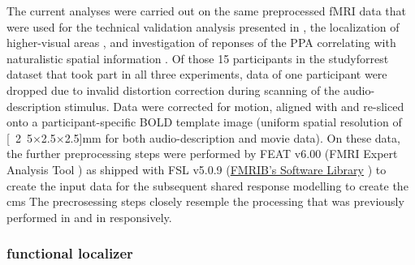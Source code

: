 
The current analyses were carried out on the same preprocessed fMRI data
\citep{hanke2016aligned} that were used for the technical validation analysis
presented in \citet{hanke2016simultaneous}, the localization of higher-visual
areas \citep{sengupta2016extension}, and investigation of reponses of the PPA
correlating with naturalistic spatial information \citep{sengupta2016extension}.
Of those 15 participants in the studyforrest dataset that took part in all three
experiments, data of one participant were dropped due to invalid distortion
correction during scanning of the audio-description stimulus.
Data were corrected for motion, aligned with and re-sliced onto a
participant-specific BOLD template image \citep{sengupta2016extension} (uniform
spatial resolution of \unit[2.5$\times$2.5$\times$2.5]{mm} for both
audio-description and movie data).
On these data, the further preprocessing steps were performed by FEAT v6.00
(FMRI Expert Analysis Tool \citep{woolrich2001autocorr}) as shipped with FSL
v5.0.9 (\href{https://www.fmrib.ox.ac.uk/fsl}{FMRIB's Software Library}
\citep{smith2004fsl}) to create the input data for the subsequent shared
response modelling to create the \ac{cms}
%
The precrosessing steps closely resemple the processing that was previously
performed in \citet{sengupta2016extension} and in \citet{haeusler2022processing}
responsively.

%

\subsubsection{functional localizer}

